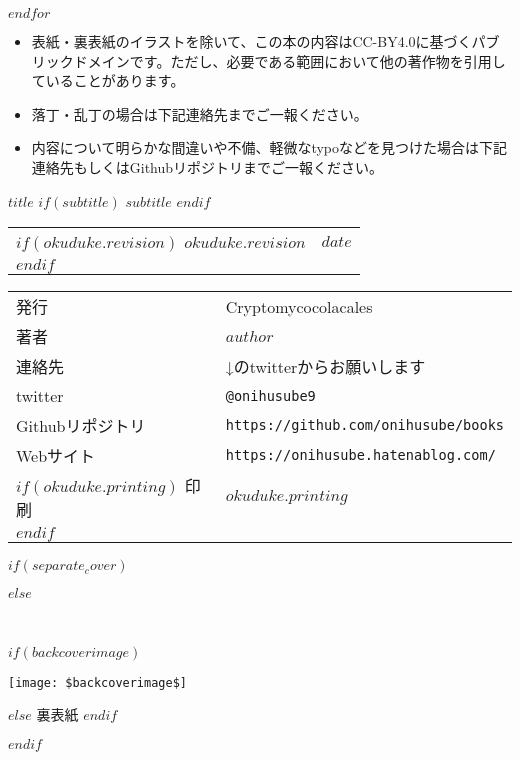 $endfor$


\clearpage

\pagestyle{empty}

\begin{itemize}
  \item 表紙・裏表紙のイラストを除いて、この本の内容はCC-BY4.0に基づくパブリックドメインです。ただし、必要である範囲において他の著作物を引用していることがあります。
  \item 落丁・乱丁の場合は下記連絡先までご一報ください。
  \item 内容について明らかな間違いや不備、軽微なtypoなどを見つけた場合は下記連絡先もしくはGithubリポジトリまでご一報ください。
\end{itemize}


\begin{center}
\textsf{$title$}
$if(subtitle)$
$subtitle$
$endif$

\begin{tabular}{ll}
$if(okuduke.revision)$
$okuduke.revision$ & $date$ \\
$endif$
\end{tabular}

\begin{tabular}{ll} \toprule
  発行      & Cryptomycocolacales \\
  著者      & $author$ \\
  連絡先    & ↓のtwitterからお願いします \\
  twitter  & \verb|@onihusube9| \\
  Githubリポジトリ  & \verb|https://github.com/onihusube/books| \\
  Webサイト & \verb|https://onihusube.hatenablog.com/| \\
  $if(okuduke.printing)$
  印刷      & $okuduke.printing$  \\
  $endif$
\end{tabular}
\end{center}

$if(separate_cover)$

$else$

\clearpage
\clearpage

$if(backcoverimage)$

\enlargethispage{\paperwidth}
\thispagestyle{empty}
\vspace*{-1truein}
\vspace*{-\topmargin}
\vspace*{-\headheight}
\vspace*{-\headsep}
\vspace*{-\topskip}
\noindent\hspace*{-1in}\hspace*{-\evensidemargin}
\texttt{[image: \$backcoverimage\$]}

$else$
裏表紙
$endif$

$endif$

